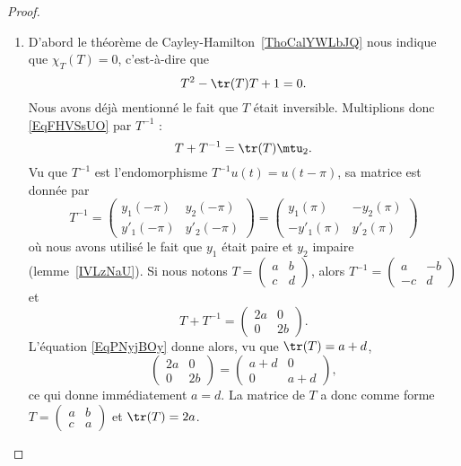 \begin{proof}
\begin{enumerate}
		\item

		      D'abord le théorème de Cayley-Hamilton~\ref{ThoCalYWLbJQ} nous indique que \( \chi_T(T)=0\), c'est-à-dire que
		      \begin{equation}    \label{EqFHVSsUO}
			      T^2-\tr(T)T+1=0.
		      \end{equation}
		      Nous avons déjà mentionné le fait que \( T\) était inversible. Multiplions donc \eqref{EqFHVSsUO} par \( T^{-1}\) :
		      \begin{equation}    \label{EqPNyjBOy}
			      T+T^{-1}=\tr(T)\mtu_2.
		      \end{equation}
		      Vu que \( T^{-1}\) est l'endomorphisme \( T^{-1}u(t)=u(t-\pi)\), sa matrice est donnée par
		      \begin{equation}
			      T^{-1}=\begin{pmatrix}
				      y_1(-\pi)  & y_2(-\pi)  \\
				      y'_1(-\pi) & y'_2(-\pi)
			      \end{pmatrix}=\begin{pmatrix}
				      y_1(\pi)   & -y_2(\pi) \\
				      -y'_1(\pi) & y'_2(\pi)
			      \end{pmatrix}
		      \end{equation}
		      où nous avons utilisé le fait que \( y_1\) était paire et \( y_2\) impaire (lemme~\ref{IVLzNaU}). Si nous notons \( T=\begin{pmatrix}
			      a & b \\
			      c & d
		      \end{pmatrix}\), alors \( T^{-1}=\begin{pmatrix}
			      a  & -b \\
			      -c & d
		      \end{pmatrix}\) et
		      \begin{equation}
			      T+T^{-1}=\begin{pmatrix}
				      2a & 0  \\
				      0  & 2b
			      \end{pmatrix}.
		      \end{equation}
		      L'équation \eqref{EqPNyjBOy} donne alors, vu que \( \tr(T)=a+d\),
		      \begin{equation}
			      \begin{pmatrix}
				      2a & 0  \\
				      0  & 2b
			      \end{pmatrix}=\begin{pmatrix}
				      a+d & 0   \\
				      0   & a+d
			      \end{pmatrix},
		      \end{equation}
		      ce qui donne immédiatement \( a=d\). La matrice de \( T\) a donc comme forme \( T=\begin{pmatrix}
			      a & b \\
			      c & a
		      \end{pmatrix}\) et \( \tr(T)=2a\).


\end{enumerate}
\end{proof}
